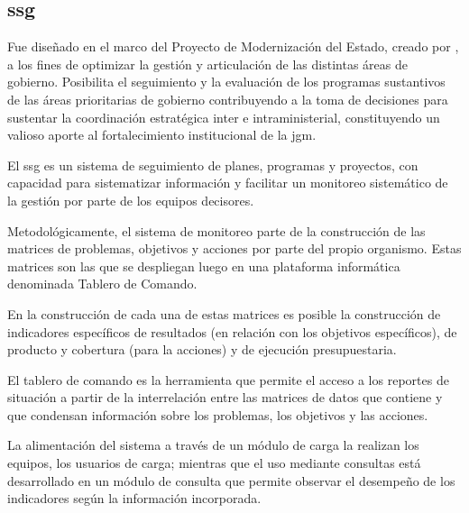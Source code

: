 \subsection{\acrfull{ssg}}


Fue diseñado en el marco del Proyecto de Modernización del Estado, creado por \textcite{decreto103}, a los fines de optimizar la gestión y articulación de las distintas áreas de gobierno. Posibilita el seguimiento  y la evaluación de los programas sustantivos de las áreas prioritarias de gobierno contribuyendo a la toma de decisiones para sustentar la coordinación estratégica inter e intraministerial, constituyendo un valioso aporte al fortalecimiento institucional de la \ac{jgm}.

El \ac{ssg} es un sistema de seguimiento de planes, programas y proyectos, con capacidad para sistematizar información y facilitar un monitoreo sistemático de la gestión por parte de los equipos decisores. 


Metodológicamente, el sistema de monitoreo parte de la construcción de las matrices de problemas, objetivos y acciones por parte del propio organismo. Estas matrices son las que se despliegan luego en una plataforma informática denominada Tablero de Comando.

En la construcción de cada una de estas matrices es posible la construcción de indicadores específicos de resultados (en relación con los objetivos específicos), de producto y cobertura  (para la acciones) y de ejecución presupuestaria.

El tablero de comando es la herramienta que permite el acceso a los reportes de situación a partir de la interrelación entre las matrices de datos que contiene y que condensan información sobre los problemas, los objetivos y las acciones.

La alimentación del sistema a través de un módulo de carga la realizan los equipos, los usuarios de carga; mientras que el uso mediante consultas está desarrollado en un módulo de consulta que permite observar el desempeño de los indicadores según la  información incorporada.

